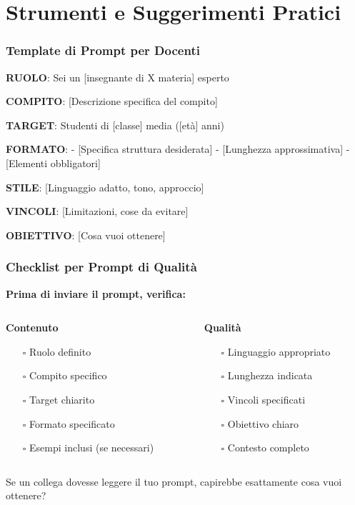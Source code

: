 \documentclass[aspectratio=169]{beamer}
\begin{document}
\section{Strumenti e Suggerimenti Pratici}
%
%
\begin{frame}
\frametitle{Template di Prompt per Docenti}
\begin{examplebox}
\textbf{RUOLO}: Sei un [insegnante di X materia] esperto

\textbf{COMPITO}: [Descrizione specifica del compito]

\textbf{TARGET}: Studenti di [classe] media ([età] anni)

\textbf{FORMATO}: 
- [Specifica struttura desiderata]
- [Lunghezza approssimativa]
- [Elementi obbligatori]

\textbf{STILE}: [Linguaggio adatto, tono, approccio]

\textbf{VINCOLI}: [Limitazioni, cose da evitare]

\textbf{OBIETTIVO}: [Cosa vuoi ottenere]
\end{examplebox}
\end{frame}
%
%
\begin{frame}
\frametitle{Checklist per Prompt di Qualità}
\textbf{Prima di inviare il prompt, verifica:}

\begin{columns}
\begin{column}{0.5\textwidth}
\textbf{Contenuto}
\begin{itemize}
    \item[$\square$] Ruolo definito
    \item[$\square$] Compito specifico
    \item[$\square$] Target chiarito
    \item[$\square$] Formato specificato
    \item[$\square$] Esempi inclusi (se necessari)
\end{itemize}
\end{column}
\begin{column}{0.5\textwidth}
\textbf{Qualità}
\begin{itemize}
    \item[$\square$] Linguaggio appropriato
    \item[$\square$] Lunghezza indicata
    \item[$\square$] Vincoli specificati
    \item[$\square$] Obiettivo chiaro
    \item[$\square$] Contesto completo
\end{itemize}
\end{column}
\end{columns}

\pause
\vspace{1cm}
\begin{tipbox}
Se un collega dovesse leggere il tuo prompt, capirebbe esattamente cosa vuoi ottenere?
\end{tipbox}
\end{frame}
\end{document}
